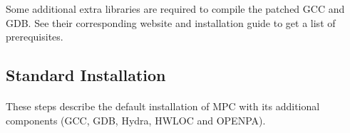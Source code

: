 \documentclass[a4paper,11pt]{article}
\begin{document}
Some additional extra libraries are required to compile the patched GCC and GDB.
See their corresponding website and installation guide to get a list of prerequisites.


\subsection{Standard Installation}

\paragraph{}
These steps describe the default installation of MPC with its additional components (GCC, GDB, Hydra, HWLOC and OPENPA).
\end{document}
